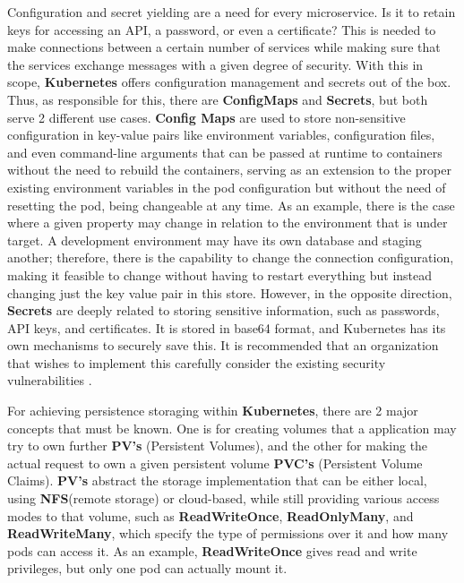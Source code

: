 Configuration and secret yielding are a need for every microservice. Is it to retain keys for accessing an API, a password, or even a certificate? This is needed to make connections between a certain number of services while making sure that the services exchange messages with a given degree of security. With this in scope, \textbf{Kubernetes} offers configuration management and secrets out of the box. Thus, as responsible for this, there are \textbf{ConfigMaps} and \textbf{Secrets}, but both serve 2 different use cases. \textbf{Config Maps} are used to store non-sensitive configuration in key-value pairs like environment variables, configuration files, and even command-line arguments that can be passed at runtime to containers without the need to rebuild the containers, serving as an extension to the proper existing environment variables in the pod configuration but without the need of resetting the pod, being changeable at any time. As an example, there is the case where a given property may change in relation to the environment that is under target. A development environment may have its own database and staging another; therefore, there is the capability to change the connection configuration, making it feasible to change without having to restart everything but instead changing just the key value pair in this store. However, in the opposite direction, \textbf{Secrets} are deeply related to storing sensitive information, such as passwords, API keys, and certificates. It is stored in base64 format, and Kubernetes has its own mechanisms to securely save this. It is recommended that an organization that wishes to implement this carefully consider the existing security vulnerabilities \cite{config-management-and-secret}.

For achieving persistence storaging within \textbf{Kubernetes}, there are 2 major concepts that must be known. One is for creating volumes that a application may try to own further \textbf{PV's} (Persistent Volumes), and the other for making the actual request to own a given persistent volume \textbf{PVC's} (Persistent Volume Claims). \textbf{PV's} abstract the storage implementation that can be either local, using \textbf{NFS}(remote storage) \cite{nfs} or cloud-based, while still providing various access modes to that volume, such as \textbf{ReadWriteOnce}, \textbf{ReadOnlyMany}, and \textbf{ReadWriteMany}, which specify the type of permissions over it and how many pods can access it. As an example, \textbf{ReadWriteOnce} gives read and write privileges, but only one pod can actually mount it.

